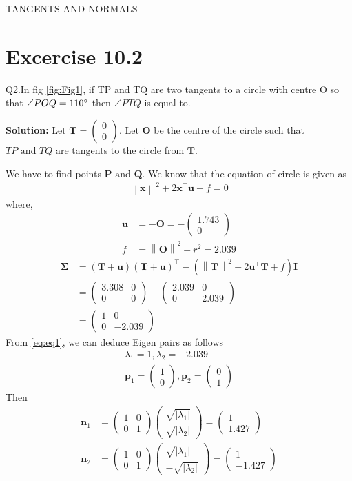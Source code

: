 \documentclass[12pt]{article}
\providecommand{\brak}[1]{\ensuremath{\left(#1\right)}}
\providecommand{\norm}[1]{\left\lVert#1\right\rVert}
\providecommand{\abs}[1]{\left\vert#1\right\vert}
\newcommand{\solution}{\noindent \textbf{Solution: }}
\newcommand{\myvec}[1]{\ensuremath{\begin{pmatrix}#1\end{pmatrix}}}
\let\vec\mathbf
\begin{document}
\begin{center}
\textbf\large{TANGENTS AND NORMALS}

\end{center}
\section*{Excercise 10.2}
Q2.In fig \ref{fig:Fig1}, if TP and TQ are two tangents to a circle with centre O so that $\angle{POQ} = 110\degree$ then $\angle{PTQ}$ is equal to.

\solution
Let $\vec{T} = \myvec{0\\0}$. Let $\vec{O}$ be the centre of the circle such that $TP \text{ and } TQ$ are tangents to the circle from $\vec{T}$.

We have to find points $\vec{P} \text{ and } \vec{Q}$. We know that the equation of circle is given as
\begin{align}
	\norm{\vec{x}}^2+2\vec{x}^\top \vec{u}+f=0
\end{align}
where,
\begin{align}
	\vec{u} &= -\vec{O} = -\myvec{1.743\\0}\\
	f &= \norm{\vec{O}}^2 - r^2 = 2.039
\end{align}
\begin{align}
	\vec{\Sigma} &= \brak{\vec{T}+\vec{u}}\brak{\vec{T}+\vec{u}}^\top - \brak{\norm{\vec{T}}^2 + 2\vec{u}^\top \vec{T}+f}\vec{I}\\
	&=\myvec{3.308&0 \\ 0&0} - \myvec{2.039&0 \\ 0&2.039}\\
	\label{eq:eq1}
	&=\myvec{1&0\\0&-2.039}
\end{align}
From \eqref{eq:eq1}, we can deduce Eigen pairs as follows
\begin{align}
	\lambda_1 = 1, \lambda_2 = -2.039\\
	\vec{p}_1 = \myvec{1\\0}, \vec{p}_2=\myvec{0\\1}
\end{align}
Then
\begin{align}
	\vec{n}_1 &= \myvec{1&0\\0&1}\myvec{\sqrt{\abs{\lambda_1}}\\\sqrt{\abs{\lambda_2}}} = \myvec{1\\1.427}\\
	\vec{n}_2 &= \myvec{1&0\\0&1}\myvec{\sqrt{\abs{\lambda_1}}\\-\sqrt{\abs{\lambda_2}}} = \myvec{1\\-1.427}
\end{align}
\end{document}
